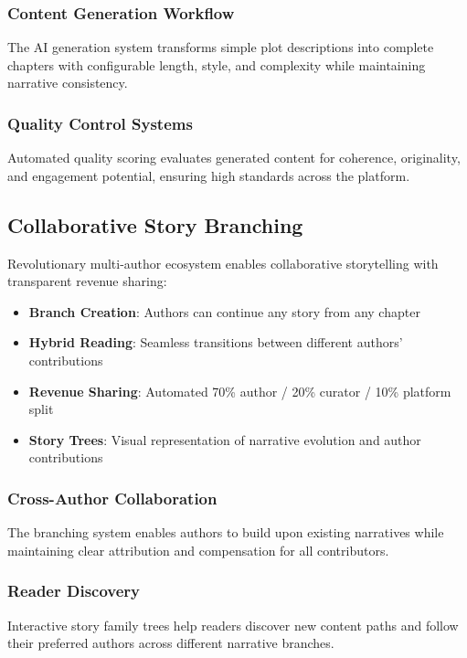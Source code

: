 \subsubsection{Content Generation Workflow}

The AI generation system transforms simple plot descriptions into complete chapters with configurable length, style, and complexity while maintaining narrative consistency.

\subsubsection{Quality Control Systems}

Automated quality scoring evaluates generated content for coherence, originality, and engagement potential, ensuring high standards across the platform.

\subsection{Collaborative Story Branching}

Revolutionary multi-author ecosystem enables collaborative storytelling with transparent revenue sharing:

\begin{itemize}
    \item \textbf{Branch Creation}: Authors can continue any story from any chapter
    \item \textbf{Hybrid Reading}: Seamless transitions between different authors' contributions
    \item \textbf{Revenue Sharing}: Automated 70\% author / 20\% curator / 10\% platform split
    \item \textbf{Story Trees}: Visual representation of narrative evolution and author contributions
\end{itemize}

\subsubsection{Cross-Author Collaboration}

The branching system enables authors to build upon existing narratives while maintaining clear attribution and compensation for all contributors.

\subsubsection{Reader Discovery}

Interactive story family trees help readers discover new content paths and follow their preferred authors across different narrative branches.